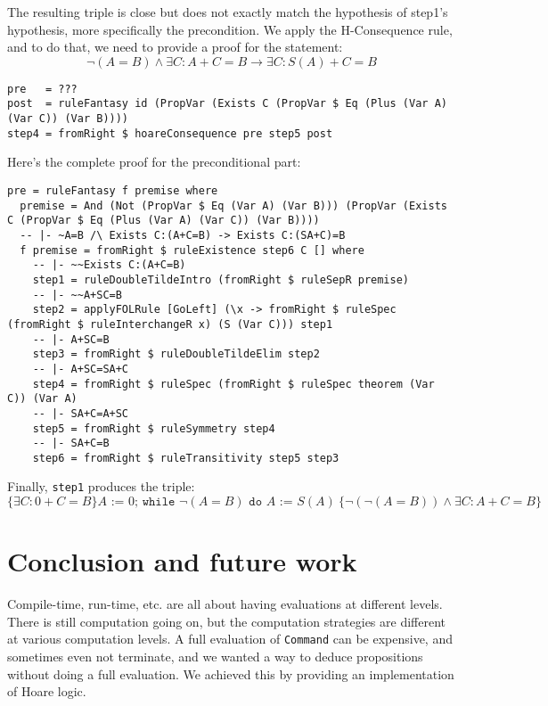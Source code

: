\documentclass{article}
\begin{document}
The resulting triple is close but does not exactly match the hypothesis of step1's hypothesis, more specifically the precondition. We apply the H-Consequence rule, and to do that, we need to provide a proof for the statement:
$$\neg (A = B) \land \exists C: A + C = B \to \exists C: S(A) + C = B$$

\begin{lstlisting}
pre   = ???
post  = ruleFantasy id (PropVar (Exists C (PropVar $ Eq (Plus (Var A) (Var C)) (Var B))))
step4 = fromRight $ hoareConsequence pre step5 post
\end{lstlisting}

Here's the complete proof for the preconditional part:

\begin{lstlisting}
pre = ruleFantasy f premise where
  premise = And (Not (PropVar $ Eq (Var A) (Var B))) (PropVar (Exists C (PropVar $ Eq (Plus (Var A) (Var C)) (Var B))))
  -- |- ~A=B /\ Exists C:(A+C=B) -> Exists C:(SA+C)=B
  f premise = fromRight $ ruleExistence step6 C [] where
    -- |- ~~Exists C:(A+C=B)
    step1 = ruleDoubleTildeIntro (fromRight $ ruleSepR premise)
    -- |- ~~A+SC=B
    step2 = applyFOLRule [GoLeft] (\x -> fromRight $ ruleSpec (fromRight $ ruleInterchangeR x) (S (Var C))) step1
    -- |- A+SC=B
    step3 = fromRight $ ruleDoubleTildeElim step2
    -- |- A+SC=SA+C
    step4 = fromRight $ ruleSpec (fromRight $ ruleSpec theorem (Var C)) (Var A)
    -- |- SA+C=A+SC
    step5 = fromRight $ ruleSymmetry step4
    -- |- SA+C=B
    step6 = fromRight $ ruleTransitivity step5 step3
\end{lstlisting}

Finally, \texttt{step1} produces the triple:
$$\{\exists C: 0+C=B\} A \texttt{ := } 0 \texttt{; while } \neg(A = B) \texttt{ do }A\texttt{ := }S(A) \ \{\neg (\neg (A = B)) \land \exists C: A + C = B\}$$

\section{Conclusion and future work}

Compile-time, run-time, etc. are all about having evaluations at different levels. There is still computation going on, but the computation strategies are different at various computation levels. A full evaluation of \texttt{Command} can be expensive, and sometimes even not terminate, and we wanted a way to deduce propositions without doing a full evaluation. We achieved this by providing an implementation of Hoare logic.
\end{document}
